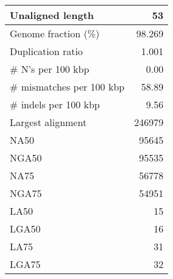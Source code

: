 \documentclass[12pt,a4paper]{article}
\begin{document}
\begin{table}[ht]
\begin{center}
\begin{tabular}{|l*{1}{|r}|}
Unaligned length & 53 \\ \hline
Genome fraction (\%) & 98.269 \\ \hline
Duplication ratio & 1.001 \\ \hline
\# N's per 100 kbp & 0.00 \\ \hline
\# mismatches per 100 kbp & 58.89 \\ \hline
\# indels per 100 kbp & 9.56 \\ \hline
Largest alignment & 246979 \\ \hline
NA50 & 95645 \\ \hline
NGA50 & 95535 \\ \hline
NA75 & 56778 \\ \hline
NGA75 & 54951 \\ \hline
LA50 & 15 \\ \hline
LGA50 & 16 \\ \hline
LA75 & 31 \\ \hline
LGA75 & 32 \\ \hline
\end{tabular}
\end{center}
\end{table}
\end{document}
